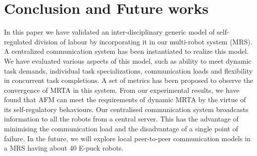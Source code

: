 \documentclass{llncs}
\begin{document}
\section{Conclusion and Future works}
\label{sec:conc}
In this paper we have validated an inter-disciplinary generic model of self-regulated division of labour by incorporating it in our multi-robot system (MRS). A centralized communication system has been instantiated to realize this model. We have evaluated various aspects of this model, such as ability to meet dynamic task demands, individual task specializations, communication loads and flexibility in concurrent task completions. A set of metrics has been proposed to observe the convergence of MRTA in this system. From our experimental results, we have found that AFM can meet the requirements of dynamic MRTA by the virtue of its self-regulatory behaviours. Our centralised communication system broadcasts information to all the robots from a central server. This has the advantage of minimising the communication load and the disadvantage of a single point of failure. In the future, we will explore local peer-to-peer communication models in a MRS having about 40 E-puck robots.
\end{document}
